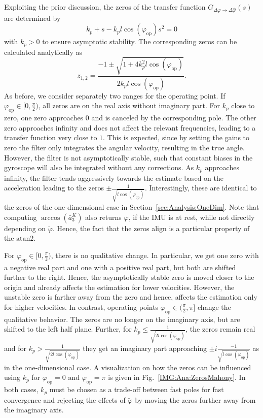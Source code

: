 Exploiting the prior discussion, the zeros of the transfer function $G_{\Delta \varphi \to \Delta \hat{\varphi}}(s)$ are determined by
\begin{equation}
	k_p + s  - k_p l \cos(\varphi_{\mathrm{op}}) s^2 = 0
\end{equation}
with $k_p>0$ to ensure asymptotic stability.
The corresponding zeros can be calculated analytically as
\begin{equation}
	z_{1,2} = \frac{-1\pm\sqrt{1+4k_p^2l\cos(\varphi_{\mathrm{op}})}}{2k_p l \cos(\varphi_{\mathrm{op}})}.
\end{equation}
As before, we consider separately two ranges for the operating point.
If $\varphi_{\mathrm{op}}\in[0,\frac{\pi}{2})$, all zeros are on the real axis without imaginary part.
For $k_p$ close to zero, one zero approaches $0$ and is canceled by the corresponding pole.
The other zero approaches infinity and does not affect the relevant frequencies, leading to a transfer function very close to $1$.
This is expected, since by setting the gains to zero the filter only integrates the angular velocity, resulting in the true angle.
However, the filter is not asymptotically stable, such that constant biases in the gyroscope will also be integrated without any corrections.
As $k_p$ approaches infinity, the filter tends aggressively towards the estimate based on the acceleration leading to the zeros $\pm\frac{1}{\sqrt{l\cos(\varphi_{\mathrm{op}})}}$.
Interestingly, these are identical to the zeros of the one-dimensional case in Section~\ref{sec:Analysis:OneDim}.
Note that computing $\arccos(\bar{a}^K_3)$ also returns $\varphi$, if the \ac{IMU} is at rest, while not directly depending on $\ddot{\varphi}$.
Hence, the fact that the zeros align is a particular property of the $\mathrm{atan2}$.

For $\varphi_{\mathrm{op}}\in[0,\frac{\pi}{2})$, there is no qualitative change.
In particular, we get one zero with a negative real part and one with a positive real part, but both are shifted further to the right.
Hence, the asymptotically stable zero is moved closer to the origin and already affects the estimation for lower velocities.
However, the unstable zero is farther away from the zero and hence, affects the estimation only for higher velocities.
In contrast, operating points $\varphi_{\mathrm{op}}\in(\frac{\pi}{2},\pi]$ change the qualitative behavior. 
The zeros are no longer on the imaginary axis, but are shifted to the left half plane.
Further, for $k_p \leq \frac{1}{\sqrt{2l\cos(\varphi_{\mathrm{op}})}}$, the zeros remain real and for $k_p > \frac{1}{\sqrt{2l\cos(\varphi_{\mathrm{op}})}}$ they get an imaginary part approaching $\pm i \frac{-1}{\sqrt{l\cos(\varphi_{\mathrm{op}})}}$ as in the one-dimensional case.
A visualization on how the zeros can be influenced using $k_p$ for $\varphi_{\mathrm{op}} = 0$ and $\varphi_{\mathrm{op}}=\pi$ is given in Fig.~\ref{IMG:Ana:ZerosMahony}.
In both cases, $k_p$ must be chosen as a trade-off between fast poles for fast convergence and rejecting the effects of $\ddot{\varphi}$ by moving the zeros further away from the imaginary axis.

